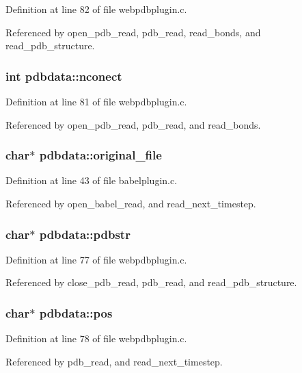 Definition at line 82 of file webpdbplugin.c.

Referenced by open\_\-pdb\_\-read, pdb\_\-read, read\_\-bonds, and read\_\-pdb\_\-structure.
\subsubsection{\setlength{\rightskip}{0pt plus 5cm}int pdbdata::nconect}\label{structpdbdata_m10}




Definition at line 81 of file webpdbplugin.c.

Referenced by open\_\-pdb\_\-read, pdb\_\-read, and read\_\-bonds.
\subsubsection{\setlength{\rightskip}{0pt plus 5cm}char$\ast$ pdbdata::original\_\-file}\label{structpdbdata_m2}




Definition at line 43 of file babelplugin.c.

Referenced by open\_\-babel\_\-read, and read\_\-next\_\-timestep.
\subsubsection{\setlength{\rightskip}{0pt plus 5cm}char$\ast$ pdbdata::pdbstr}\label{structpdbdata_m16}




Definition at line 77 of file webpdbplugin.c.

Referenced by close\_\-pdb\_\-read, pdb\_\-read, and read\_\-pdb\_\-structure.
\subsubsection{\setlength{\rightskip}{0pt plus 5cm}char$\ast$ pdbdata::pos}\label{structpdbdata_m17}




Definition at line 78 of file webpdbplugin.c.

Referenced by pdb\_\-read, and read\_\-next\_\-timestep.
